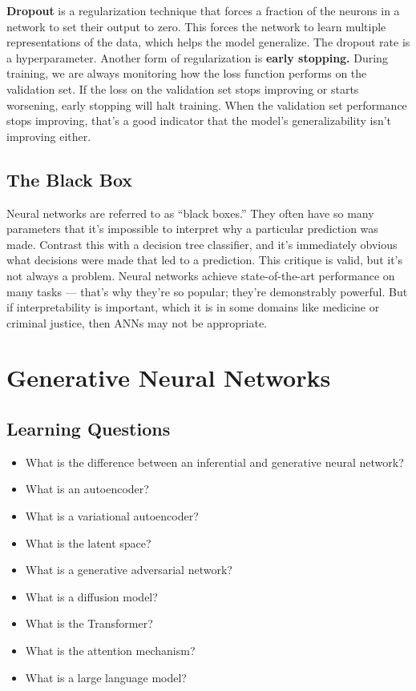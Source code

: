 \textbf{Dropout} is a regularization technique that forces a fraction of the neurons in a network to set their output to zero. This forces the network to learn multiple representations of the data, which helps the model generalize. The dropout rate is a hyperparameter. Another form of regularization is \textbf{early stopping.} During training, we are always monitoring how the loss function performs on the validation set. If the loss on the validation set stops improving or starts worsening, early stopping will halt training. When the validation set performance stops improving, that's a good indicator that the model's generalizability isn't improving either.

\subsection*{The Black Box}
Neural networks are referred to as ``black boxes.'' They often have so many parameters that it's impossible to interpret why a particular prediction was made. Contrast this with a decision tree classifier, and it's immediately obvious what decisions were made that led to a prediction. This critique is valid, but it's not always a problem. Neural networks achieve state-of-the-art performance on many tasks --- that's why they're so popular; they're demonstrably powerful. But if interpretability is important, which it is in some domains like medicine or criminal justice, then ANNs may not be appropriate.


\clearpage
\section{Generative Neural Networks}
\subsection*{Learning Questions}
\begin{itemize}
    \item What is the difference between an inferential and generative neural network?
    \item What is an autoencoder?
    \item What is a variational autoencoder?
    \item What is the latent space?
    \item What is a generative adversarial network?
    \item What is a diffusion model?
    \item What is the Transformer?
    \item What is the attention mechanism?
    \item What is a large language model?
\end{itemize}

